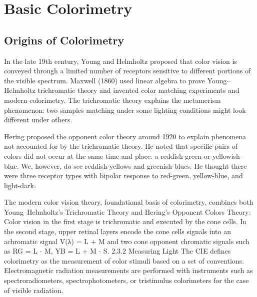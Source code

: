 \section{Basic Colorimetry}%
\label{sec:basic-colorimetry}

\subsection{Origins of Colorimetry}%
\label{subsec:origins-of-colorimetry}

In the late 19th century, Young and Helmholtz proposed that color vision is conveyed through a limited number of receptors sensitive to different portions of the visible spectrum. Maxwell (1860) used linear algebra to prove Young–Helmholtz trichromatic theory and invented color matching experiments and modern colorimetry. The trichromatic theory explains the metamerism phenomenon: two samples matching under some lighting conditions might look different under others.


Hering proposed the opponent color theory around 1920 to explain phenomena not accounted for by the trichromatic theory. He noted that specific pairs of colors did not occur at the same time and place: a reddish-green or yellowish-blue. We, however, do see reddish-yellows and greenish-blues. He thought there were three receptor types with bipolar response to red-green, yellow-blue, and light-dark.


The modern color vision theory,  foundational basis of colorimetry, combines both Young–Helmholtz's Trichromatic Theory and Hering’s Opponent Colors Theory: Color vision in the first stage is trichromatic and executed by the cone cells. In the second stage, upper retinal layers encode the cone cells signals into an achromatic signal V(λ) = L + M and two cone opponent chromatic signals such as RG = L - M, YB = L + M - S.
2.3.2 Measuring Light
The CIE defines colorimetry as the measurement of color stimuli based on a set of conventions. Electromagnetic radiation measurements are performed with instruments such as spectroradiometers, spectrophotometers, or tristimulus colorimeters for the case of visible radiation.

